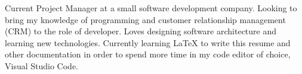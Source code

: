 

\begin{cvparagraph}
    
    Current Project Manager at a small software development company. Looking to bring my knowledge of programming and customer relationship management (CRM) to the role of developer. Loves designing software architecture and learning new technologies. Currently learning LaTeX to write this resume and other documentation in order to spend more time in my code editor of choice, Visual Studio Code.
\end{cvparagraph}